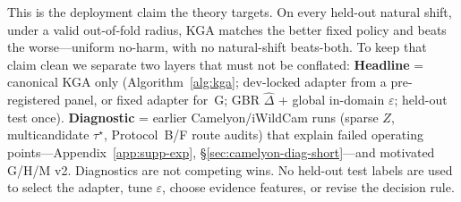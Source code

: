 \documentclass[conference]{IEEEtran}
\theoremstyle{plain}
\theoremstyle{definition}
\theoremstyle{remark}
\begin{document}
This is the deployment claim the theory targets. On every held-out natural shift, under a valid
out-of-fold radius, \textsc{KGA} matches the better fixed policy and beats the worse---uniform
no-harm, with no natural-shift beats-both. To keep that claim clean we separate two layers that must
not be conflated:
\textbf{Headline} = canonical \textsc{KGA} only (Algorithm~\ref{alg:kga}; dev-locked adapter
from a pre-registered panel, or fixed adapter for~G; GBR $\widehat\Delta$ + global
in-domain $\varepsilon$; held-out test once).
\textbf{Diagnostic} = earlier Camelyon/iWildCam runs (sparse $Z$, multicandidate $\tau^\star$,
Protocol~B/F route audits) that explain failed operating points---Appendix~\ref{app:supp-exp},
\S\ref{sec:camelyon-diag-short}---and motivated G/H/M v2. Diagnostics are not competing wins.
No held-out test labels are used to select the adapter, tune $\varepsilon$, choose evidence
features, or revise the decision rule.

\begin{table}[t]\centering\footnotesize
\caption{\textbf{Natural-shift protocols at a glance.} The adapter is locked on a dev split, never
on held-out test; \textsc{KGA}'s $\widehat\Delta$ and $\varepsilon$ are calibrated on the dev split,
and the held-out test is scored once. Status: CI-robust = both regret-gap bootstrap CIs exclude
zero; point = point-estimate beats-both that ties the better fixed policy under resampling; no-harm
= matches the better fixed policy without beating both.}
\label{tab:protocols}
\end{table}
\end{document}
